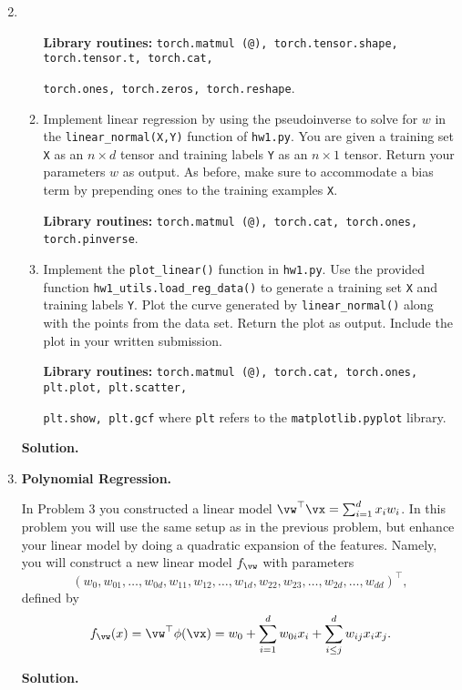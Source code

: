 \documentclass{article}
\theoremstyle{definition}
\theoremstyle{remark}
\newenvironment{Q}
{%
  \clearpage
  \item
  }
  {%
    \phantom{s} %
    \bigskip
    \textbf{Solution.}
  }
\begin{document}
\begin{enumerate}[font={\Large\bfseries},left=0pt]
\begin{Q}
\begin{enumerate}
          \textbf{Library routines:} \texttt{torch.matmul (@), torch.tensor.shape, torch.tensor.t, torch.cat,} 

          \texttt{torch.ones, torch.zeros, torch.reshape}.

        \item Implement linear regression by using the pseudoinverse to solve for $w$ in the \texttt{linear\_normal(X,Y)} function of \texttt{hw1.py}. You are given a training set \texttt{X} as an $n \times d$ tensor and training labels \texttt{Y} as an $n \times 1$ tensor. Return your parameters $w$ as output. As before, make sure to accommodate a bias term by prepending ones to the training examples \texttt{X}.

          \textbf{Library routines:} \texttt{torch.matmul (@), torch.cat, torch.ones, torch.pinverse}.

        \item Implement the \texttt{plot\_linear()} function in \texttt{hw1.py}.  Use the provided function \texttt{hw1\_utils.load\_reg\_data()} to generate a training set \texttt{X} and training labels \texttt{Y}. Plot the curve generated by \texttt{linear\_normal()} along with the points from the data set.  Return the plot as output.  Include the plot in your written submission.

          \textbf{Library routines:} \texttt{torch.matmul (@), torch.cat, torch.ones, plt.plot, plt.scatter,}

          \texttt{plt.show, plt.gcf} where \texttt{plt} refers to the \texttt{matplotlib.pyplot} library.
      \end{enumerate}
    \end{Q}

    \begin{Q}
  \textbf{\Large Polynomial Regression.}

  In Problem 3 you constructed a linear model $\vw^\top \vx = \sum_{i=1}^d x_i w_i$.  In this problem you will use the same setup as in the previous problem, but enhance your linear model by doing a quadratic expansion of the features.  Namely, you will construct a new linear model $f_{\vw}$ with parameters
  \[
    (w_{0}, w_{01},\dots,w_{0d},w_{11}, w_{12},\dots,w_{1d},w_{22}, w_{23},\dots,w_{2d},\dots, w_{dd})^\top,
  \]
    defined by
  	\begin{align*}
  	f_{\vw}(x) = \vw^\top \phi(\vx) = w_0 + \sum_{i=1}^d w_{0i} x_i + \sum_{i\leq j}^dw_{ij} x_ix_j.
  	\end{align*}
  	

\end{Q}
\end{enumerate}
\end{document}
